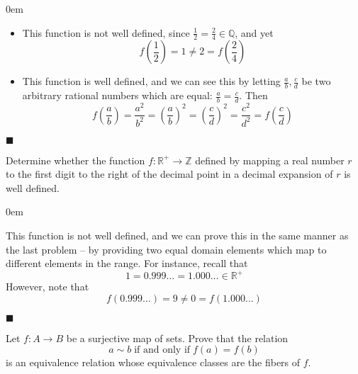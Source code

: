 \documentclass[12pt]{article}
\renewcommand{\qed}{\hfill$\blacksquare$}
\renewenvironment{proof}{\begin{addmargin}[1em]{0em}\begin{newproof}}{\end{newproof}\end{addmargin}\qed}
\newenvironment{problem}[2][Exercise]{\begin{trivlist}
\item[\hskip \labelsep {\bfseries #1}\hskip \labelsep {\bfseries #2.}]}{\end{trivlist}}
\begin{document}
\begin{proof}
\begin{itemize}
    \item This function is not well defined, since $\frac{1}{2}=\frac{2}{4} \in \mathbb{Q}$, and yet
    $$ f\left(\frac{1}{2}\right) = 1 \neq 2 = f\left(\frac{2}{4}\right) $$
    \item This function is well defined, and we can see this by letting $\frac{a}{b}, \frac{c}{d}$ be two arbitrary rational numbers which are equal: $\frac{a}{b} = \frac{c}{d}$. Then
    $$ f\left(\frac{a}{b}\right) = \frac{a^2}{b^2} = \left(\frac{a}{b}\right)^2 = \left(\frac{c}{d}\right)^2 = \frac{c^2}{d^2} = f\left(\frac{c}{d}\right) $$
\end{itemize}
\end{proof}




\begin{problem}{0.1.6}
Determine whether the function $f:\mathbb{R}^+ \rightarrow \mathbb{Z}$ defined by mapping a real number $r$ to the first digit to the right of the decimal point in a decimal expansion of $r$ is well defined.
\end{problem}

\begin{proof}
This function is not well defined, and we can prove this in the same manner as the last problem -- by providing two equal domain elements which map to different elements in the range. For instance, recall that
$$ 1 = 0.999\ldots = 1.000\ldots \in \mathbb{R}^+ $$
However, note that
$$ f\left(0.999\ldots\right) = 9 \neq 0 = f\left(1.000\ldots\right) $$
\end{proof}






\begin{problem}{0.1.7}
Let $f:A\rightarrow B$ be a surjective map of sets. Prove that the relation
$$ a \sim b \; \text{if and only if} \; f\left(a\right) = f\left(b\right) $$ is an equivalence relation whose equivalence classes are the fibers of $f$.
\end{problem}
\end{document}
